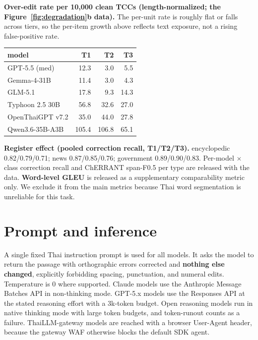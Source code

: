 \documentclass[11pt]{article}
\begin{document}
\textbf{Over-edit rate per 10{,}000 clean TCCs (length-normalized; the
Figure~\ref{fig:degradation}b data).} The per-unit rate is roughly flat or falls across tiers,
so the per-item growth above reflects text exposure, not a rising false-positive rate.
\begin{center}\small
\begin{tabular}{@{}lrrr@{}}
\toprule
model & T1 & T2 & T3 \\
\midrule
GPT-5.5 (med)    & 12.3  & 3.0   & 5.5  \\
Gemma-4-31B      & 11.4  & 3.0   & 4.3  \\
GLM-5.1          & 17.8  & 9.3   & 14.3 \\
Typhoon 2.5 30B  & 56.8  & 32.6  & 27.0 \\
OpenThaiGPT v7.2 & 35.0  & 44.0  & 27.8 \\
Qwen3.6-35B-A3B  & 105.4 & 106.8 & 65.1 \\
\bottomrule
\end{tabular}
\end{center}
\textbf{Register effect (pooled correction recall, T1/T2/T3).} encyclopedic 0.82/0.79/0.71;
news 0.87/0.85/0.76; government 0.89/0.90/0.83. Per-model $\times$ class correction recall and
ChERRANT span-F0.5 per type are released with the data. \textbf{Word-level GLEU} is released as
a supplementary comparability metric only. We exclude it from the main metrics because Thai
word segmentation is unreliable for this task.

\section{Prompt and inference}
\label{app:prompt}
A single fixed Thai instruction prompt is used for all models. It asks the model to return the
passage with orthographic errors corrected and \textbf{nothing else changed}, explicitly
forbidding spacing, punctuation, and numeral edits. Temperature is 0 where supported. Claude
models use the Anthropic Message Batches API in non-thinking mode. GPT-5.x models use the
Responses API at the stated reasoning effort with a 3k-token budget. Open reasoning models run
in native thinking mode with large token budgets, and token-runout counts as a failure.
ThaiLLM-gateway models are reached with a browser User-Agent header, because the gateway WAF
otherwise blocks the default SDK agent.
\end{document}
